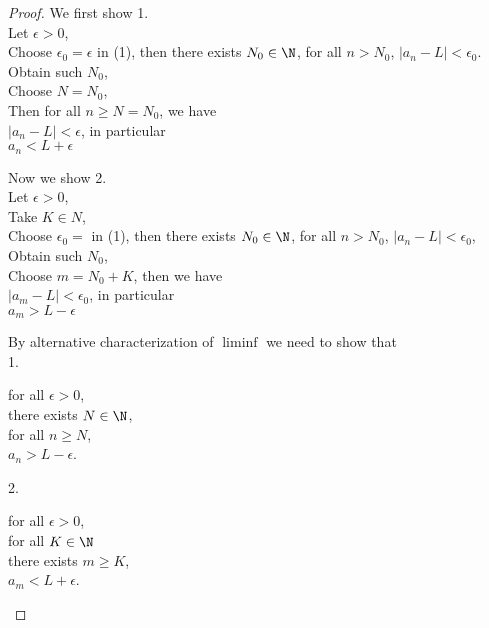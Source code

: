 \documentclass{article}
\begin{document}
\begin{proof}[Proof]
        We first show 1. \\
        Let $\epsilon > 0$, \\
        Choose $\epsilon_0 = \epsilon$ in (1), then there exists $N_0 \in \N$, for all $n > N_0$, $|a_n - L| < \epsilon_0$. \\
        Obtain such $N_0$, \\
        Choose $N = N_0$, \\
        Then for all $n \ge N = N_0$, we have \\
        $|a_n - L| < \epsilon$, in particular \\
        $a_n < L + \epsilon$

        Now we show 2. \\
        Let $\epsilon > 0$, \\
        Take $K \in N$, \\
        Choose $\epsilon_0 = $ in (1), then there exists $N_0 \in \N$, for all $n > N_0$, $|a_n -L| < \epsilon_0$, \\
        Obtain such $N_0$, \\
        Choose $m = N_0 + K$, then we have\\
        $|a_m - L| < \epsilon_0$, in particular \\
        $a_m > L - \epsilon$

        By alternative characterization of $\liminf$ we need to show that \\
        1. \begin{center}
            \parbox{\linewidth}{
                \linewidth
                for all $\epsilon > 0$, \\
                \hspace*{1em} there exists $N \in \N$, \\
                \hspace*{2em} for all $n \ge N$, \\
                \hspace*{3em} $a_n > L - \epsilon$.
            }
        \end{center}
        2. \begin{center}
            \parbox{\linewidth}{
                \linewidth
                for all $\epsilon > 0$, \\
                \hspace*{1em} for all $K \in \N$ \\
                \hspace*{2em} there exists $m \ge K$, \\
                \hspace*{3em} $a_m < L + \epsilon$.
            }
        \end{center}


\end{proof}
\end{document}
